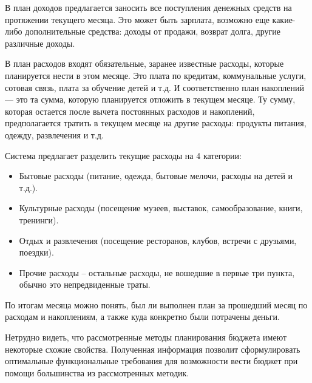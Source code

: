 В план доходов предлагается заносить все поступления денежных средств на протяжении текущего месяца.
Это может быть зарплата, возможно еще какие-либо дополнительные средства: доходы от продажи, возврат долга, другие различные доходы.

В план расходов входят обязательные, заранее известные расходы, которые планируется нести в этом месяце.
Это плата по кредитам, коммунальные услуги, сотовая связь, плата за обучение детей и т.д.
И соответственно план накоплений — это та сумма, которую планируется отложить в текущем месяце.
Ту сумму, которая остается после вычета постоянных расходов и накоплений, предполагается тратить в текущем месяце на другие расходы: продукты питания, одежду, развлечения и т.д.

Система предлагает разделить текущие расходы на 4 категории:
\begin{itemize}
    \item Бытовые расходы (питание, одежда, бытовые мелочи, расходы на детей и т.д.).
    \item Культурные расходы (посещение музеев, выставок, самообразование, книги, тренинги).
    \item Отдых и развлечения (посещение ресторанов, клубов, встречи с друзьями, поездки).
    \item Прочие расходы -- остальные расходы, не вошедшие в первые три пункта, обычно это непредвиденные траты.
\end{itemize}

По итогам месяца можно понять, был ли выполнен план за прошедший месяц по расходам и накоплениям, а также куда конкретно были потрачены деньги.

Нетрудно видеть, что рассмотренные методы планирования бюджета имеют некоторые схожие свойства.
Полученная информация позволит сформулировать оптимальные функциональные требования для возможности вести бюджет при помощи большинства из рассмотренных методик.